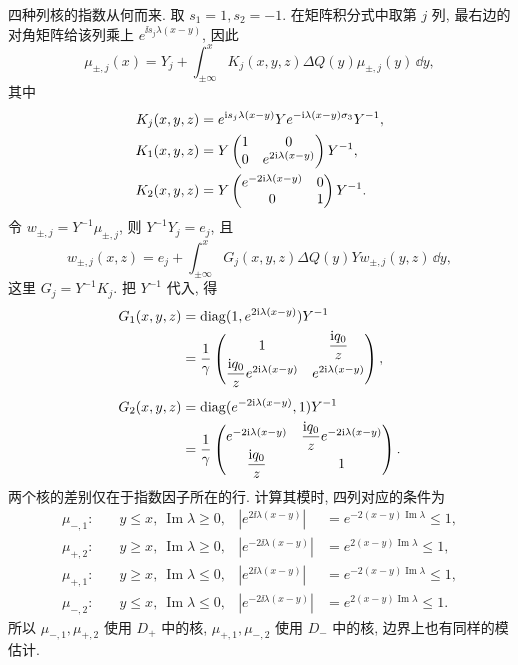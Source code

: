 \par\medskip\noindent 四种列核的指数从何而来.\quad
取 $s_1=1,s_2=-1$. 在矩阵积分式中取第 $j$ 列,
最右边的对角矩阵给该列乘上 $e^{\ii s_j\lambda(x-y)}$, 因此
\begin{equation*}
\mu_{\pm,j}(x)
=Y_j+\int_{\pm\infty}^{x}
K_j(x,y,z)\Delta Q(y)\mu_{\pm,j}(y)\,\dd y,
\end{equation*}
其中
\begin{align*}
K_j(x,y,z)
&=e^{\mathrm{i} s_j\lambda(x-y)}Ye^{-\mathrm{i}\lambda(x-y)\sigma_3}Y^{-1},\\
K_1(x,y,z)
&=Y\begin{pmatrix}1&0\\0&e^{2\mathrm{i}\lambda(x-y)}\end{pmatrix}Y^{-1},\\
K_2(x,y,z)
&=Y\begin{pmatrix}e^{-2\mathrm{i}\lambda(x-y)}&0\\0&1\end{pmatrix}Y^{-1}.
\end{align*}
令 $w_{\pm,j}=Y^{-1}\mu_{\pm,j}$, 则 $Y^{-1}Y_j=e_j$, 且
\begin{equation*}
w_{\pm,j}(x,z)
=e_j+\int_{\pm\infty}^{x}
G_j(x,y,z)\Delta Q(y)Yw_{\pm,j}(y,z)\,\dd y,
\end{equation*}
这里 $G_j=Y^{-1}K_j$. 把 $Y^{-1}$ 代入, 得
\begin{align*}
G_1(x,y,z)
&=\operatorname{diag}(1,e^{2\mathrm{i}\lambda(x-y)})Y^{-1}\\
&=\dfrac{1}{\gamma}
\begin{pmatrix}
1&\dfrac{\mathrm{i} q_0}{z}\\[3pt]
\dfrac{\mathrm{i} q_0}{z}e^{2\mathrm{i}\lambda(x-y)}&e^{2\mathrm{i}\lambda(x-y)}
\end{pmatrix},\\[4pt]
G_2(x,y,z)
&=\operatorname{diag}(e^{-2\mathrm{i}\lambda(x-y)},1)Y^{-1}\\
&=\dfrac{1}{\gamma}
\begin{pmatrix}
e^{-2\mathrm{i}\lambda(x-y)}&\dfrac{\mathrm{i} q_0}{z}e^{-2\mathrm{i}\lambda(x-y)}\\[3pt]
\dfrac{\mathrm{i} q_0}{z}&1
\end{pmatrix}.
\end{align*}
两个核的差别仅在于指数因子所在的行. 计算其模时, 四列对应的条件为
\begin{align*}
\mu_{-,1}:&\quad y\le x,\ \operatorname{Im}\lambda\ge0,
&|e^{2\ii\lambda(x-y)}|&=e^{-2(x-y)\operatorname{Im}\lambda}\le1,\\
\mu_{+,2}:&\quad y\ge x,\ \operatorname{Im}\lambda\ge0,
&|e^{-2\ii\lambda(x-y)}|&=e^{2(x-y)\operatorname{Im}\lambda}\le1,\\
\mu_{+,1}:&\quad y\ge x,\ \operatorname{Im}\lambda\le0,
&|e^{2\ii\lambda(x-y)}|&=e^{-2(x-y)\operatorname{Im}\lambda}\le1,\\
\mu_{-,2}:&\quad y\le x,\ \operatorname{Im}\lambda\le0,
&|e^{-2\ii\lambda(x-y)}|&=e^{2(x-y)\operatorname{Im}\lambda}\le1.
\end{align*}
所以 $\mu_{-,1},\mu_{+,2}$ 使用 $D_+$ 中的核,
$\mu_{+,1},\mu_{-,2}$ 使用 $D_-$ 中的核, 边界上也有同样的模估计.

